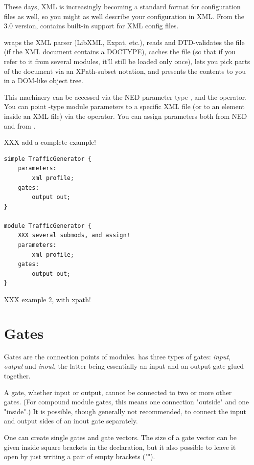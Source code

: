 These days, XML is increasingly becoming a standard format for configuration
files as well, so you might as well describe your configuration in XML.
From the 3.0 version, {\opp} contains built-in support for XML config files.

{\opp} wraps the XML parser (LibXML, Expat, etc.), reads and DTD-validates
the file (if the XML document contains a DOCTYPE), caches the file
(so that if you refer to it from several modules, it'll still be loaded
only once), lets you pick parts of the document via an XPath-subset notation,
and presents the contents to you in a DOM-like object tree.

This machinery can be accessed via the NED parameter type , and the
 operator. You can point -type module parameters
to a specific XML file (or to an element inside an XML file) via the
 operator. You can assign  parameters both from NED
and from .

XXX add a complete example!

\begin{verbatim}
simple TrafficGenerator {
    parameters:
        xml profile;
    gates:
        output out;
}

module TrafficGenerator {
    XXX several submods, and assign!
    parameters:
        xml profile;
    gates:
        output out;
}
\end{verbatim}

XXX example 2, with xpath!

\section{Gates}
\label{sec:ch-ned-lang:gates}

Gates are the connection points of modules.  {\opp} has three types of
gates: \textit{input}, \textit{output} and \textit{inout}, the latter being
essentially an input and an output gate glued together.

A gate, whether input or output, cannot be connected to two or more other
gates. (For compound module gates, this means one connection "outside" and
one "inside".)  It is possible, though generally not recommended, to
connect the input and output sides of an inout gate separately.

One can create single gates and gate vectors. The size of a gate vector
can be given inside square brackets in the declaration, but it also possible
to leave it open by just writing a pair of empty brackets ("\ttt{[]}").

